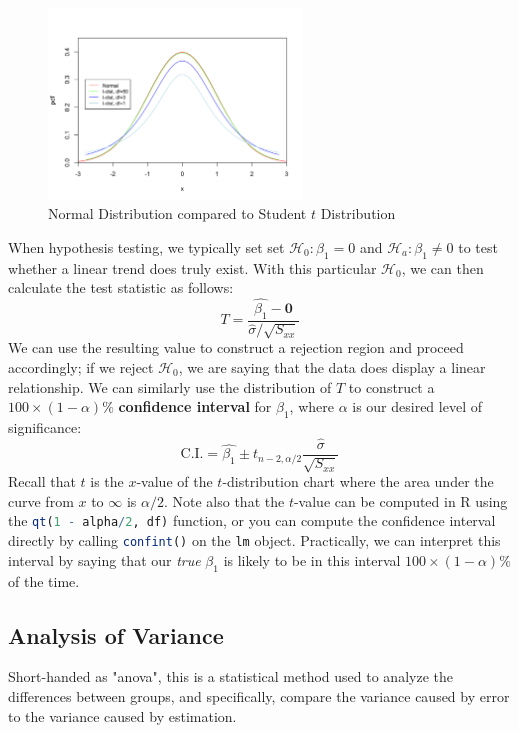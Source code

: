 \documentclass[12pt]{article}
\begin{document}
\begin{figure}[!ht]
    \centering
    \includegraphics*[width=0.6\textwidth]{img/normalvstdist.png}
    \caption{Normal Distribution compared to Student $t$ Distribution}
\end{figure}

When hypothesis testing, we typically set set $\mathcal{H}_0: \beta_1 = 0$ and $\mathcal{H}_a: \beta_1 \neq 0$ to test whether a linear trend does truly exist. With this particular $\mathcal{H}_0$, we can then calculate the test statistic as follows: \[T = \frac{\hat{\beta_1} - \mathbf{0}}{\hat{\sigma} / \sqrt{S_{xx}}}\] We can use the resulting value to construct a rejection region and proceed accordingly; if we reject $\mathcal{H}_0$, we are saying that the data does display a linear relationship.
We can similarly use the distribution of $T$ to construct a $100 \times (1- \alpha)\%$ \textbf{confidence interval} for $\beta_1$, where $\alpha$ is our desired level of significance: \[\text{C.I.} = \hat{\beta_1} \pm t_{n-2, \alpha/2} \frac{\hat{\sigma}}{\sqrt{S_{xx}}}\] Recall that $t$ is the $x$-value of the $t$-distribution chart where the area under the curve from $x$ to $\infty$ is $\alpha/2$. Note also that the $t$-value can be computed in R using the \lstinline[language=R]{qt(1 - alpha/2, df)} function, or you can compute the confidence interval directly by calling \lstinline[language=R]{confint()} on the \lstinline[language=R]{lm} object.
Practically, we can interpret this interval by saying that our \textit{true} $\beta_1$ is likely to be in this interval $100 \times(1 - \alpha)\%$ of the time.

\subsection{Analysis of Variance}

\begin{definitionEnd}
    Short-handed as "anova", this is a statistical method used to analyze the differences between groups, and specifically, compare the variance caused by error to the variance caused by estimation.
\end{definitionEnd}
\end{document}
